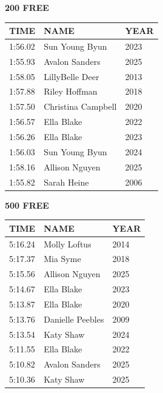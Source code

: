 \begin{table}[H]
\centering
\begin{minipage}[t]{0.48\textwidth}
\centering
\textbf{200 FREE}\\[0.1cm]
\begin{tabular}{@{}p{1.8cm}p{2.8cm}p{1.2cm}@{}}
\hline
    \textbf{TIME} & \textbf{NAME} & \textbf{YEAR} \\
\hline
    1:56.02 & Sun Young Byun & 2023 \\
    1:55.93 & Avalon Sanders & 2025 \\
    1:58.05 & LillyBelle Deer & 2013 \\
    1:57.88 & Riley Hoffman & 2018 \\
    1:57.50 & Christina Campbell & 2020 \\
    1:56.57 & Ella Blake & 2022 \\
    1:56.26 & Ella Blake & 2023 \\
    1:56.03 & Sun Young Byun & 2024 \\
    1:58.16 & Allison Nguyen & 2025 \\
    1:55.82 & Sarah Heine & 2006 \\
\hline
\end{tabular}
\end{minipage}\hfill
\begin{minipage}[t]{0.48\textwidth}
\centering
\textbf{500 FREE}\\[0.1cm]
\begin{tabular}{@{}p{1.8cm}p{2.8cm}p{1.2cm}@{}}
\hline
    \textbf{TIME} & \textbf{NAME} & \textbf{YEAR} \\
\hline
    5:16.24 & Molly Loftus & 2014 \\
    5:17.37 & Mia Syme & 2018 \\
    5:15.56 & Allison Nguyen & 2025 \\
    5:14.67 & Ella Blake & 2023 \\
    5:13.87 & Ella Blake & 2020 \\
    5:13.76 & Danielle Peebles & 2009 \\
    5:13.54 & Katy Shaw & 2024 \\
    5:11.55 & Ella Blake & 2022 \\
    5:10.82 & Avalon Sanders & 2025 \\
    5:10.36 & Katy Shaw & 2025 \\
\hline
\end{tabular}
\end{minipage}
\end{table}

